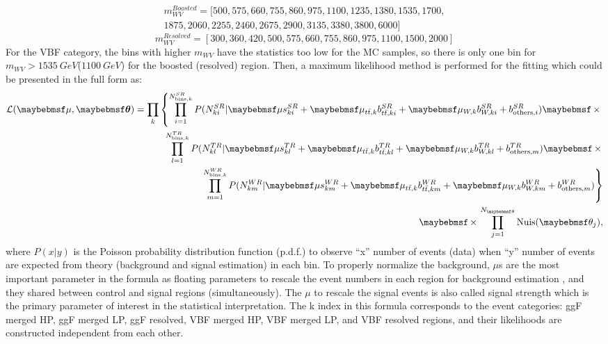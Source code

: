 \begin{multline}
m^{Boosted}_{WV}= [500, 575, 660, 755, 860, 975, 1100, 1235, 1380, 1535, 1700,\\ 1875, 2060, 2255, 2460, 2675, 2900, 3135, 3380, 3800, 6000]
\end{multline}
\noindent
\begin{equation}
m^{Resolved}_{WV}= [300, 360, 420, 500, 575, 660, 755, 860, 975, 1100, 1500, 2000]
\end{equation}
\noindent
For the VBF category, the bins with higher $m_{WV}$ have the statistics too low for the MC samples, so there is only one bin  for  $m_{WV}>1535~GeV$($1100~GeV$) for the boosted (resolved) region. Then, a maximum likelihood method is performed for the fitting which could be presented in the full form as:
 \begin{eqnarray}
 \label{Eq. ML_all}
 \mathcal{L}(\mu, \mbox{\boldmath $\theta$}) = \displaystyle\prod_{k} \left\{
 \displaystyle\prod_{i=1}^{N_{{\rm bins},k}^{SR}}P(N_{ki}^{SR}|\mu s_{ki}^{SR} + \mu_{t\bar{t},k} b_{t\bar{t},ki}^{SR} + \mu_{W,k} b_{W,ki}^{SR} + b_{{\rm others},i}^{SR})
 \times \right. \nonumber \\
 \displaystyle\prod_{l=1}^{N_{{\rm bins},k}^{TR}}P(N_{kl}^{TR}|\mu s_{kl}^{TR} + \mu_{t\bar{t},k} b_{t\bar{t},kl}^{TR} + \mu_{W,k} b_{W,kl}^{TR} + b_{{\rm others},m}^{TR})
 \times \nonumber \\
 \left. \displaystyle\prod_{m=1}^{N_{{\rm bins},k}^{WR}}P(N_{km}^{WR}|\mu s_{km}^{WR} + \mu_{t\bar{t},k} b_{t\bar{t},km}^{WR} + \mu_{W,k} b_{W,km}^{WR} + b_{{\rm others},m}^{WR})
 \right\} \nonumber \\
 \times\displaystyle\prod_{j=1}^{N_{\theta}}{\rm Nuis}(\theta_j),
 \label{Eq:likelihood}
 \end{eqnarray}
where $P(x|y)$ is the Poisson probability distribution function (p.d.f.) to observe ``x'' number of events (data) when ``y'' number of events are expected from theory (background and signal estimation) in each bin. To properly normalize the background, $\mu$s are the most important parameter in the formula as floating parameters to rescale the event numbers in each region for background estimation , and they shared between control and signal regions (simultaneously). The $\mu$ to rescale the signal events is also called signal strength which is the primary parameter of interest in the statistical interpretation. The k index in this formula corresponds to the event categories: ggF merged HP, ggF merged LP, ggF resolved, VBF merged HP, VBF merged LP, and VBF resolved regions, and their likelihoods are constructed independent from each other.
